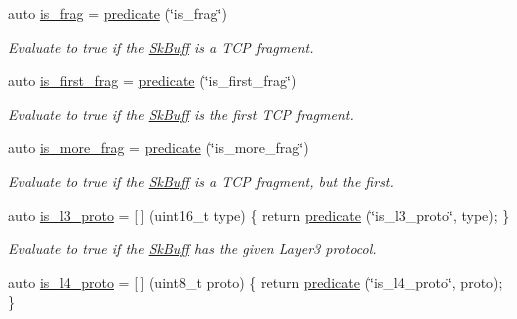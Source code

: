 \begin{DoxyCompactItemize}
auto \hyperlink{namespacepfq_1_1lang_1_1anonymous__namespace_02default_8hpp_03_af042e092c925ae6306ae85ae5a56563d}{is\+\_\+frag} = \hyperlink{namespacepfq_1_1lang_aca9adafc436b7f851621b979fa1aaf88}{predicate} (\char`\"{}is\+\_\+frag\char`\"{})
\begin{DoxyCompactList}\small\item\em Evaluate to {\ttfamily true} if the \hyperlink{structpfq_1_1lang_1_1SkBuff}{Sk\+Buff} is a T\+CP fragment. \end{DoxyCompactList}\item 
auto \hyperlink{namespacepfq_1_1lang_1_1anonymous__namespace_02default_8hpp_03_afb797cc442d04e614a9ac68c7c4c35ff}{is\+\_\+first\+\_\+frag} = \hyperlink{namespacepfq_1_1lang_aca9adafc436b7f851621b979fa1aaf88}{predicate} (\char`\"{}is\+\_\+first\+\_\+frag\char`\"{})
\begin{DoxyCompactList}\small\item\em Evaluate to {\ttfamily true} if the \hyperlink{structpfq_1_1lang_1_1SkBuff}{Sk\+Buff} is the first T\+CP fragment. \end{DoxyCompactList}\item 
auto \hyperlink{namespacepfq_1_1lang_1_1anonymous__namespace_02default_8hpp_03_a0b169afb2f21c8626f06f77ca75feded}{is\+\_\+more\+\_\+frag} = \hyperlink{namespacepfq_1_1lang_aca9adafc436b7f851621b979fa1aaf88}{predicate} (\char`\"{}is\+\_\+more\+\_\+frag\char`\"{})
\begin{DoxyCompactList}\small\item\em Evaluate to {\ttfamily true} if the \hyperlink{structpfq_1_1lang_1_1SkBuff}{Sk\+Buff} is a T\+CP fragment, but the first. \end{DoxyCompactList}\item 
auto \hyperlink{namespacepfq_1_1lang_1_1anonymous__namespace_02default_8hpp_03_a814bb9c3c833dc2af342d695b1d503e8}{is\+\_\+l3\+\_\+proto} = \mbox{[}$\,$\mbox{]} (uint16\+\_\+t type) \{ return \hyperlink{namespacepfq_1_1lang_aca9adafc436b7f851621b979fa1aaf88}{predicate} (\char`\"{}is\+\_\+l3\+\_\+proto\char`\"{}, type); \}
\begin{DoxyCompactList}\small\item\em Evaluate to {\ttfamily true} if the \hyperlink{structpfq_1_1lang_1_1SkBuff}{Sk\+Buff} has the given Layer3 protocol. \end{DoxyCompactList}\item 
auto \hyperlink{namespacepfq_1_1lang_1_1anonymous__namespace_02default_8hpp_03_a9d06d4dedca1ebdc3b270cb2f3e9e42b}{is\+\_\+l4\+\_\+proto} = \mbox{[}$\,$\mbox{]} (uint8\+\_\+t proto) \{ return \hyperlink{namespacepfq_1_1lang_aca9adafc436b7f851621b979fa1aaf88}{predicate} (\char`\"{}is\+\_\+l4\+\_\+proto\char`\"{}, proto); \}

\end{DoxyCompactItemize}
